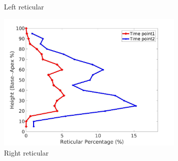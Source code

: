 \begin{figure}[H]
\begin{subfigure}{.42\linewidth}
  \caption{Left reticular}
  \label{fig:IPF13DiseaseAgainstHeight-c} 
\end{subfigure} 
\begin{subfigure}{.42\linewidth}%
  \includegraphics[width=\linewidth,trim={{.0\wd0} {.0\wd0} {.0\wd0} {.0\wd0}},clip]{Appendix/Image_AppexA/BaseToApex/IPF13RightLungReticularDiseaseAgainstHeight.jpg}
  \caption{Right reticular}
  \label{fig:IPF13DiseaseAgainstHeight-d}
\end{subfigure}
\begin{subfigure}{.42\linewidth}%

\end{subfigure}
\end{figure}

